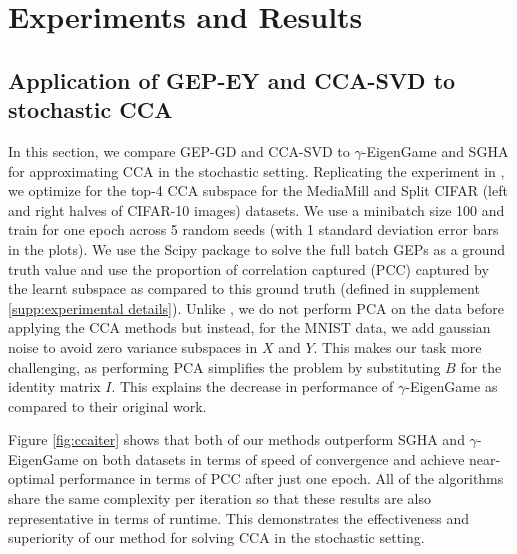 \section{Experiments and Results}

\subsection{Application of GEP-EY and CCA-SVD to stochastic CCA}

In this section, we compare GEP-GD and CCA-SVD to $\gamma$-EigenGame \cite{gemp2022generalized} and SGHA \cite{chen2019constrained} for approximating CCA in the stochastic setting. Replicating the experiment in \cite{meng2021online, gemp2022generalized}, we optimize for the top-4 CCA subspace for the MediaMill and Split CIFAR (left and right halves of CIFAR-10 images) datasets. We use a minibatch size 100 and train for one epoch across 5 random seeds (with 1 standard deviation error bars in the plots). We use the Scipy \cite{virtanen2020scipy} package to solve the full batch GEPs as a ground truth value and use the proportion of correlation captured (PCC) captured by the learnt subspace as compared to this ground truth (defined in supplement \ref{supp:experimental details}). Unlike \cite{gemp2022generalized}, we do not perform PCA on the data before applying the CCA methods but instead, for the MNIST data, we add gaussian noise to avoid zero variance subspaces in $X$ and $Y$. This makes our task more challenging, as performing PCA simplifies the problem by substituting $B$ for the identity matrix $I$. This explains the decrease in performance of $\gamma$-EigenGame as compared to their original work.

Figure \ref{fig:ccaiter} shows that both of our methods outperform SGHA and $\gamma$-EigenGame on both datasets in terms of speed of convergence and achieve near-optimal performance in terms of PCC after just one epoch. All of the algorithms share the same complexity per iteration so that these results are also representative in terms of runtime. This demonstrates the effectiveness and superiority of our method for solving CCA in the stochastic setting.

